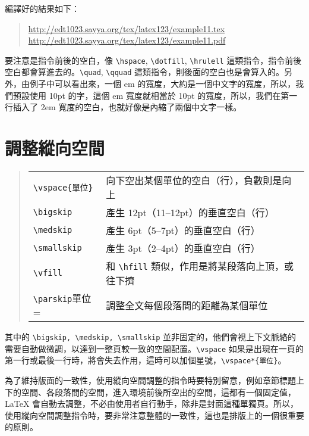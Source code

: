 編譯好的結果如下：

\begin{quote}
   \url{http://edt1023.sayya.org/tex/latex123/example11.tex}\\
   \url{http://edt1023.sayya.org/tex/latex123/example11.pdf}
\end{quote}

要注意是指令前後的空白，像 \verb|\hspace|, \verb|\dotfill|, \verb|\hrulell| 這類指令，指令前後空白都會算進去的。\verb|\quad|, \verb|\qquad| 這類指令，則後面的空白也是會算入的。另外，由例子中可以看出來，一個 em 的寬度，大約是一個中文字的寬度，所以，我們預設使用 10pt 的字，這個 em 寬度就相當於 10pt 的寬度，所以，我們在第一行插入了 2em 寬度的空白，也就好像是內縮了兩個中文字一樣。

\section{調整縱向空間}

\begin{quote}
   \begin{tabular}{ll}
      \verb=\vspace{單位}=      & 向下空出某個單位的空白（行），負數則是向上                      \\
      \verb=\bigskip=      & 產生 12pt（11--12pt）的垂直空白（行）                           \\
      \verb=\medskip=      & 產生 6pt（5--7pt）的垂直空白（行）                              \\
      \verb=\smallskip=      & 產生 3pt（2--4pt）的垂直空白（行）                              \\
      \verb=\vfill=      & 和 \verb|\hfill| 類似，作用是將某段落向上頂，或往下擠 \\
      \verb=\parskip=單位= & 調整全文每個段落間的距離為某個單位
      \index{vspace@\verb=\vspace=}\index{bigskip@\verb=\bigskip=}%
      \index{medskip@\verb=\smallskip=}\index{vfill@\verb=\vfill=}%
      \index{parskip@\verb=\parskip=}
   \end{tabular}
\end{quote}

其中的 \verb|\bigskip, \medskip, \smallskip| 並非固定的，他們會視上下文脈絡的需要自動做微調，以達到一整頁較一致的空間配置。\verb|\vspace| 如果是出現在一頁的第一行或最後一行時，將會失去作用，這時可以加個星號，\verb=\vspace*{單位}=。

為了維持版面的一致性，使用縱向空間調整的指令時要特別留意，例如章節標題上下的空間、各段落間的空間，進入環境前後所空出的空間，這都有一個固定值，\LaTeX{} 會自動去調整，不必由使用者自行動手，除非是封面這種單獨頁。所以，使用縱向空間調整指令時，要非常注意整體的一致性，這也是排版上的一個很重要的原則。

